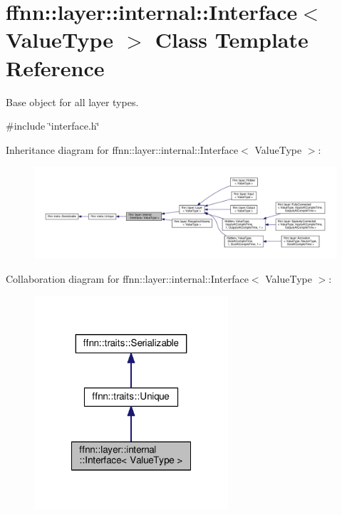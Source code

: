 \hypertarget{classffnn_1_1layer_1_1internal_1_1_interface}{\section{ffnn\-:\-:layer\-:\-:internal\-:\-:Interface$<$ Value\-Type $>$ Class Template Reference}
\label{classffnn_1_1layer_1_1internal_1_1_interface}
}


Base object for all layer types.  




{\ttfamily \#include \char`\"{}interface.\-h\char`\"{}}



Inheritance diagram for ffnn\-:\-:layer\-:\-:internal\-:\-:Interface$<$ Value\-Type $>$\-:
\nopagebreak
\begin{figure}[H]
\begin{center}
\leavevmode
\includegraphics[width=350pt]{classffnn_1_1layer_1_1internal_1_1_interface__inherit__graph}
\end{center}
\end{figure}


Collaboration diagram for ffnn\-:\-:layer\-:\-:internal\-:\-:Interface$<$ Value\-Type $>$\-:
\nopagebreak
\begin{figure}[H]
\begin{center}
\leavevmode
\includegraphics[width=204pt]{classffnn_1_1layer_1_1internal_1_1_interface__coll__graph}
\end{center}
\end{figure}
